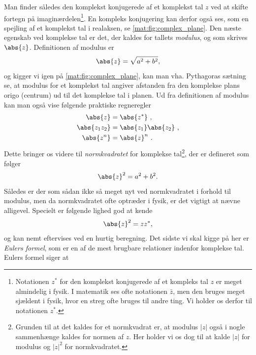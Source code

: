 Man finder således den komplekst konjugerede af et komplekst tal $z$ ved at skifte fortegn på imaginærdelen\footnote{Notationen $z^*$ for den komplekst konjugerede af et kompleks tal $z$ er meget almindelig i fysik. I matematik ses ofte notationen $\bar{z}$, men den bruges meget sjældent i fysik, hvor en streg ofte bruges til andre ting. Vi holder os derfor til notationen $z^*$.}. En kompleks konjugering kan derfor også ses, som en spejling af et komplekst tal i realaksen, se \cref{mat:fig:complex_plane}. Den næste egenskab ved komplekse tal er det, der kaldes for tallets \emph{modulus}, og som skrives $\abs{z}$. Definitionen af modulus er
\begin{equation}
    \abs{z} = \sqrt{a^2 + b^2},
\end{equation}
og kigger vi igen på \cref{mat:fig:complex_plane}, kan man vha. Pythagoras sætning se, at modulus for et komplekst tal angiver afstanden fra den komplekse plans origo (centrum) ud til det komplekse tal i planen. Ud fra definitionen af modulus kan man også vise følgende praktiske regneregler
\begin{subequations}
\begin{align}
    \abs{z} &= \abs{z^*}  \ , \label{mat:eq:modulus_regneregler1} \\
    \abs{z_1 z_2} &= \abs{z_1} \abs{z_2} \ , \label{mat:eq:modulus_regneregler2} \\
    \abs{z^n} &= \abs{z}^n \ . \label{mat:eq:modulus_regneregler3}
\end{align}
\end{subequations}
Dette bringer os videre til \emph{normkvadratet} for komplekse tal\footnote{Grunden til at det kaldes for et normkvadrat er, at modulus $|z|$ også i nogle sammenhænge kaldes for normen af $z$. Her holder vi os dog til at kalde $|z|$ for modulus og $|z|^2$ for normkvadratet.}, der er defineret som følger
\begin{equation}
    \label{mat:eq:normkvadrat}
    \abs{z}^2 = a^2 + b^2.
\end{equation}
Således er der som sådan ikke så meget nyt ved normkvadratet i forhold til modulus, men da normkvadratet ofte optræder i fysik, er det vigtigt at nævne alligevel. Specielt er følgende lighed god at kende
\begin{equation}
    \label{mat:eq:normkvadrat2}
    \abs{z}^2 = zz^*,
\end{equation} 
og kan nemt eftervises ved en hurtig beregning. Det sidste vi skal kigge på her er \emph{Eulers formel}, som er en af de mest brugbare relationer indenfor komplekse tal. Eulers formel siger at
